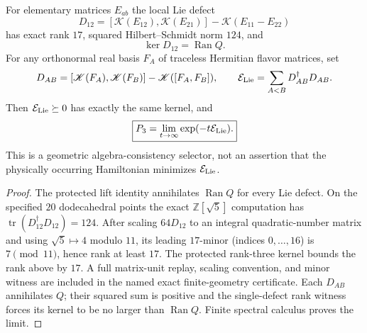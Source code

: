 \documentclass[11pt]{article}
\begin{document}
\begin{theorem}
\label{p1b:thm:fullcarrier-lie-defect-kernel}
For elementary matrices $E_{ab}$ the local Lie defect
\[
 D_{12}=[\mathscr K(E_{12}),\mathscr K(E_{21})]
 -\mathscr K(E_{11}-E_{22})
\]
has exact rank $17$, squared Hilbert--Schmidt norm $124$, and
\[
 \boxed{\ker D_{12}=\operatorname{Ran}Q.}
\]
For any orthonormal real basis $F_A$ of traceless Hermitian flavor
matrices, set
\[
 D_{AB}=[\mathscr K(F_A),\mathscr K(F_B)]
 -\mathscr K([F_A,F_B]),\qquad
 \mathcal E_{\rm Lie}=\sum_{A<B}D_{AB}^\dagger D_{AB}.
\]
Then $\mathcal E_{\rm Lie}\succeq0$ has exactly the same kernel, and
\[
 \boxed{P_3=\lim_{t\to\infty}\exp(-t\mathcal E_{\rm Lie}).}
\]
This is a geometric algebra-consistency selector, not an assertion
that the physically occurring Hamiltonian minimizes $\mathcal E_{\rm Lie}$.
\end{theorem}
\begin{proof}
The protected lift identity annihilates $\operatorname{Ran}Q$
for every Lie defect.  On the specified $20$ dodecahedral points the
exact $\mathbb Z[\sqrt5]$ computation has
$\operatorname{tr}(D_{12}^\dagger D_{12})=124$.
After scaling $64D_{12}$ to an integral quadratic-number matrix and
using $\sqrt5\mapsto4$ modulo $11$, its leading $17$-minor
(indices $0,\ldots,16$) is $7\pmod{11}$, hence rank at least $17$.
The protected rank-three kernel bounds the rank above by $17$.
A full matrix-unit replay, scaling convention, and minor witness are
included in the named exact finite-geometry certificate.
Each $D_{AB}$ annihilates $Q$; their squared sum is positive and the
single-defect rank witness forces its kernel to be no larger than
$\operatorname{Ran}Q$.  Finite spectral calculus proves the limit.
\end{proof}
\end{document}
